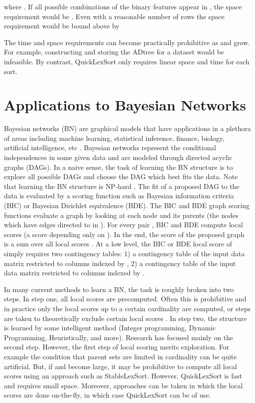 \documentclass[a4paper,10pt,reqno]{amsart}
\theoremstyle{definition}
\begin{document}
where . If all possible combinations
of the binary features appear in , the space requirement would be .
Even with a reasonable number of rows the space requirement would be bound
above by 

 
The time
and space requirements can become practically prohibitive as  and  grow.
For example, constructing and storing the ADtree for a dataset  would be infeasible.  By contrast, QuickLexSort only requires
linear space and time for each sort.


\section{Applications to Bayesian Networks}
\label{sec:bn}
Bayesian networks (BN) are graphical models that have applications in a
plethora of areas including machine learning, statistical inference, finance,
biology, artificial intelligence, etc \cite{kollar2009probabilistic,
studeny2005probabilistic}. Bayesian networks represent the conditional
independences in some given data and are modeled through directed acyclic
graphs (DAGs). In a naive sense, the task of learning the BN structure is to
explore all possible DAGs and choose the DAG which best fits the data. Note
that learning the BN structure is NP-hard \cite{chickering1996learning,chickering2004large}. The fit
of a proposed DAG to the data is evaluated by a scoring function such as
Bayesian information criteria (BIC) or Bayesian Dirichlet equivalence (BDE). 
The BIC and BDE graph scoring functions evaluate a graph  by looking
at each node  and its parents  (the nodes which have edges directed
to  in ). For every pair , BIC and BDE compute local scores (a
score depending only on ). In the end, the score of the proposed
graph  is a sum over all local scores .  At
a low level, the BIC or BDE local score of  simply requires two
contingency tables: 1) a contingency table of the input data matrix restricted
to columns indexed by , 2) a contingency table of the input data matrix
restricted to columns indexed by .

In many current methods to learn a BN, the task is roughly broken into two
steps. In step one, all local scores are precomputed. Often this is prohibitive
and in practice only the local scores up to a certain cardinality are computed,
or steps are taken to theoretically exclude certain local scores
\cite{de2011efficient,de2009structure}.  In step two, the structure is
learned by some intelligent method (Integer programming, Dynamic Programming,
Heuristically, and more)\cite{de2011efficient,chickering2003optimal,de2009structure,de2000new,jaakkola2010learning,barlettadvances,cussens2012bayesian,silander2012simple,singh2005finding}. Research has focused mainly on the
second step. However, the first step of local scoring merits exploration. For
example the condition that parent sets are limited in cardinality can be quite
artificial. But, if  and  become large, it may be prohibitive to compute
all local scores using an approach such as StableLexSort. However, QuickLexSort
is fast and requires small space.  Moreover, approaches can be taken in which
the local scores are done on-the-fly, in which case QuickLexSort can be of use.
\end{document}
